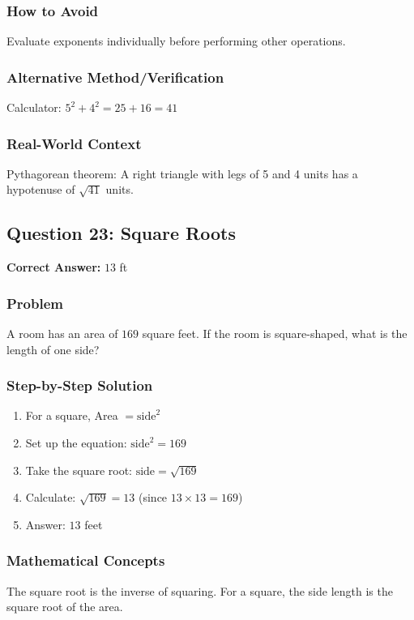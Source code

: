 \documentclass[12pt,a4paper]{article}
\begin{document}
\subsubsection*{How to Avoid}
Evaluate exponents individually before performing other operations.

\subsubsection*{Alternative Method/Verification}
Calculator: $5^2 + 4^2 = 25 + 16 = 41$ 

\subsubsection*{Real-World Context}
Pythagorean theorem: A right triangle with legs of 5 and 4 units has a hypotenuse of $\sqrt{41}$ units.

\vspace{0.5cm}

\subsection*{Question 23: Square Roots}

\textbf{Correct Answer:} $13$ ft

\subsubsection*{Problem}
A room has an area of $169$ square feet. If the room is square-shaped, what is the length of one side?

\subsubsection*{Step-by-Step Solution}
\begin{enumerate}
    \item For a square, Area $= \text{side}^2$
    \item Set up the equation: $\text{side}^2 = 169$
    \item Take the square root: $\text{side} = \sqrt{169}$
    \item Calculate: $\sqrt{169} = 13$ (since $13 \times 13 = 169$)
    \item Answer: $13$ feet
\end{enumerate}

\subsubsection*{Mathematical Concepts}
The square root is the inverse of squaring. For a square, the side length is the square root of the area.
\end{document}
